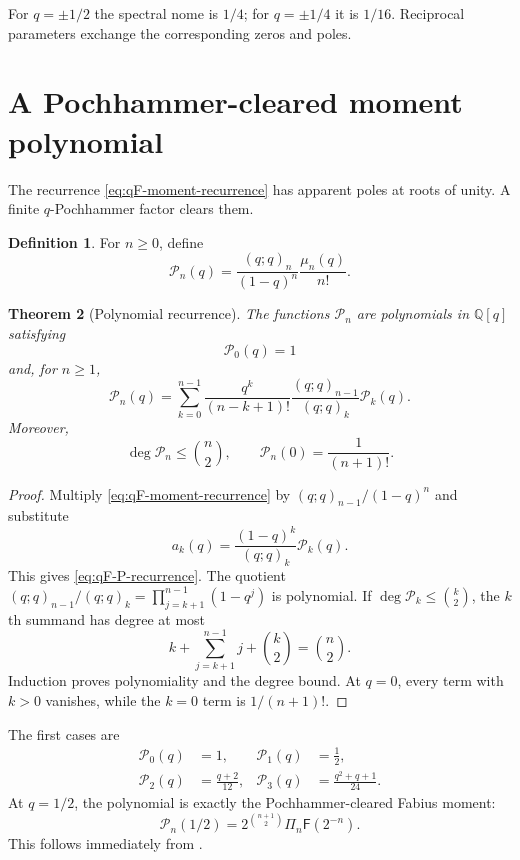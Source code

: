 \documentclass[11pt,oneside,openany]{book}
\newtheorem{theorem}{Theorem}[chapter]
\theoremstyle{definition}
\newtheorem{definition}[theorem]{Definition}
\theoremstyle{remark}
\newcommand{\Q}{\mathbb Q}
\newcommand{\Fab}{\mathsf F}
\begin{document}
For $q=\pm1/2$ the spectral nome is $1/4$; for $q=\pm1/4$ it is $1/16$.
Reciprocal parameters exchange the corresponding zeros and poles.

\section{A Pochhammer-cleared moment polynomial}

The recurrence \eqref{eq:qF-moment-recurrence} has apparent poles at roots of
unity.  A finite $q$-Pochhammer factor clears them.

\begin{definition}\label{def:qF-moment-polynomial}
For $n\ge0$, define
\begin{equation}\label{eq:qF-moment-polynomial}
 \mathcal P_n(q)=\frac{(q;q)_n}{(1-q)^n}\frac{\mu_n(q)}{n!}.
\end{equation}
\end{definition}

\begin{theorem}[Polynomial recurrence]\label{thm:qF-moment-polynomial}
The functions $\mathcal P_n$ are polynomials in $\Q[q]$ satisfying
\begin{equation}\label{eq:qF-P0}
 \mathcal P_0(q)=1
\end{equation}
and, for $n\ge1$,
\begin{equation}\label{eq:qF-P-recurrence}
 \boxed{
 \mathcal P_n(q)=\sum_{k=0}^{n-1}
 \frac{q^k}{(n-k+1)!}
 \frac{(q;q)_{n-1}}{(q;q)_k}\mathcal P_k(q).}
\end{equation}
Moreover,
\begin{equation}\label{eq:qF-P-degree}
 \deg\mathcal P_n\le\binom n2,
 \qquad
 \mathcal P_n(0)=\frac1{(n+1)!}.
\end{equation}
\end{theorem}

\begin{proof}
Multiply \eqref{eq:qF-moment-recurrence} by
$(q;q)_{n-1}/(1-q)^n$ and substitute
\[
 a_k(q)=\frac{(1-q)^k}{(q;q)_k}\mathcal P_k(q).
\]
This gives \eqref{eq:qF-P-recurrence}.  The quotient
$(q;q)_{n-1}/(q;q)_k=\prod_{j=k+1}^{n-1}(1-q^j)$ is polynomial.  If
$\deg\mathcal P_k\le\binom k2$, the $k$th summand has degree at most
\[
 k+\sum_{j=k+1}^{n-1}j+\binom k2=\binom n2.
\]
Induction proves polynomiality and the degree bound.  At $q=0$, every term
with $k>0$ vanishes, while the $k=0$ term is $1/(n+1)!$.
\end{proof}

The first cases are
\begin{align*}
 \mathcal P_0(q)&=1,
 &\mathcal P_1(q)&=\frac12,\\
 \mathcal P_2(q)&=\frac{q+2}{12},
 &\mathcal P_3(q)&=\frac{q^2+q+1}{24}.
\end{align*}
At $q=1/2$, the polynomial is exactly the Pochhammer-cleared Fabius moment:
\begin{equation}\label{eq:qF-P-half}
 \mathcal P_n(1/2)=2^{\binom{n+1}{2}}\Pi_n\Fab(2^{-n}).
\end{equation}
This follows immediately from
.
\end{document}
